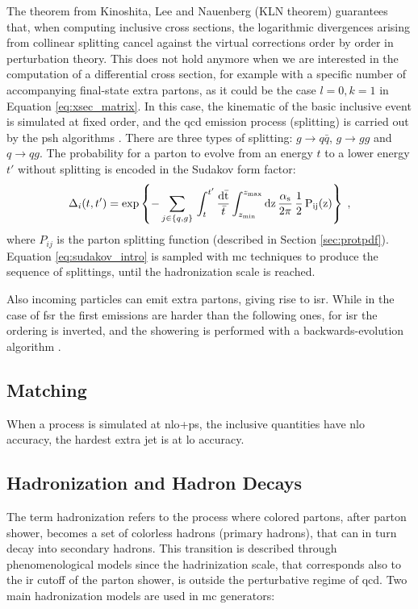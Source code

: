 The theorem from Kinoshita, Lee and Nauenberg (KLN theorem) \cite{Kinoshita:1962ur,Lee:1964is} guarantees that, 
when computing inclusive cross sections, the logarithmic divergences arising from collinear splitting cancel against the virtual corrections order by order in perturbation theory. 
This does not hold anymore when we are interested in the computation of a differential cross section, for example with a specific number of accompanying final-state extra partons, 
as it could be the case $l=0, k=1$ in Equation \ref{eq:xsec_matrix}. 
In this case, the kinematic of the basic inclusive event is simulated at fixed order, and the \gls{qcd} emission process (splitting) is carried out by the \gls{psh} algorithms \cite{Fox:1979ag}. There are three types of splitting: $g \rightarrow q\bar{q}$, $g \rightarrow gg$ and $q \rightarrow q g$.
The probability for a parton to evolve from an energy $t$ to a lower energy $t'$ without splitting is encoded in the Sudakov form factor:
\begin{equation}\label{eq:sudakov_intro}
  \Delta_i(t,t')=\exp\left\{-\sum_{j\in\{q,g\}}\,
  \int_t^{t'}\frac{\rm{d}\bar{t}}{\bar{t}}\int_{z_{\rm min}}^{z_{\rm max}}\rm{d} z\,
  \frac{\alpha_s}{2\pi}\,\frac{1}{2}\,P_{ij}(z)\right\}\;,
\end{equation}
\noindent where $P_{ij}$ is the parton splitting function (described in Section \ref{sec:protpdf}).
Equation \ref{eq:sudakov_intro} is sampled with \gls{mc} techniques to produce the sequence of splittings, until the hadronization scale is reached. 

Also incoming particles can emit extra partons, giving rise to \gls{isr}. While in the case of \gls{fsr} the first emissions are harder than the following ones, for \gls{isr} the ordering is inverted, and the showering is performed with a backwards-evolution algorithm \cite{Sjostrand:1985xi}.

\subsection{Matching}

When a process is simulated at \gls{nlo}+\gls{ps}, the inclusive quantities have \gls{nlo} accuracy, the hardest extra jet is at \gls{lo} accuracy.


\subsection{Hadronization and Hadron Decays}

The term hadronization refers to the process where colored partons, after parton shower, becomes a set of colorless hadrons (primary hadrons), 
that can in turn decay into secondary hadrons. This transition is described through phenomenological models since the hadrinization scale, that corresponds also to the \gls{ir} cutoff of the parton shower, is outside the perturbative regime of \gls{qcd}. 
Two main hadronization models are used in \gls{mc} generators:

